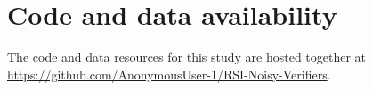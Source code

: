 \section*{Code and data availability}

The code and data resources for this study are hosted together at
\url{https://github.com/AnonymousUser-1/RSI-Noisy-Verifiers}.

